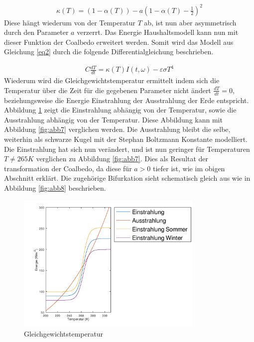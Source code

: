 \begin{refsection}
\begin{eqnarray*}
\kappa(T)=(1-\alpha(T)) - a \left( 1-\alpha(T) - \frac{1}{2} \right)^2
\end{eqnarray*}
Diese hängt wiederum von der Temperatur $T$ ab, ist nun aber asymmetrisch durch den Parameter $a$ verzerrt. Das Energie Haushaltsmodell kann nun mit dieser Funktion der Coalbedo erweitert werden. Somit wird das Modell aus Gleichung \ref{eq2} durch die folgende Differentialgleichung beschrieben. 

\begin{eqnarray} \label{eq5}
C \frac{d T}{d t} =  \kappa(T) I(t, \omega) - \varepsilon \sigma T^4
\end{eqnarray}
Wiederum wird die Gleichgewichtstemperatur ermittelt indem sich die Temperatur über die Zeit für die gegebenen Parameter nicht ändert $\frac{d T}{d t}=0$, beziehungsweise die Energie Einstrahlung der Ausstrahlung der Erde entspricht. Abbildung \ref{fig:abb11} zeigt die Einstrahlung abhängig von der Temperatur, sowie die Ausstrahlung abhängig von der Temperatur. Diese Abbildung kann mit Abbildung \ref{fig:abb7} verglichen werden. Die Ausstrahlung bleibt die selbe, weiterhin als schwarze Kugel mit der Stephan Boltzmann Konstante modelliert. Die Einstrahlung hat sich nun verändert, und ist nun geringer für Temperaturen $T \neq 265 K$ verglichen zu Abbildung \ref{fig:abb7}. Dies als Resultat der transformation der Coalbedo, da diese für $a>0$ tiefer ist, wie im obigen Abschnitt erklärt. Die zugehörige Bifurkation sieht schematisch gleich aus wie in Abbildung \ref{fig:abb8} beschrieben. 
%
\begin{figure}
	\centering
	\includegraphics[width= 0.8\textwidth]{neigung/Strahlung_3.png}
	\caption[Gleichgewichtstemperatur]{Gleichgewichtstemperatur}
	\label{fig:abb11}
\end{figure}
%


\end{refsection}
